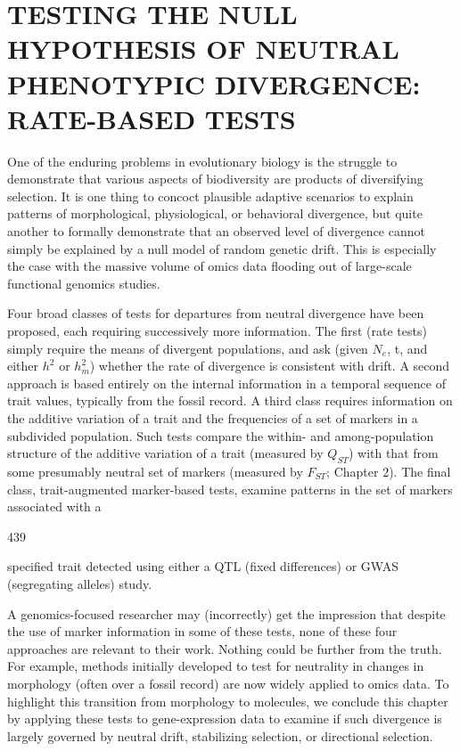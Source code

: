 \documentclass{article}
\begin{document}
\section{TESTING THE NULL HYPOTHESIS OF NEUTRAL PHENOTYPIC DIVERGENCE: RATE-BASED TESTS}
One of the enduring problems in evolutionary biology is the struggle to demonstrate that various aspects of biodiversity are products of diversifying selection. It is one thing to concoct plausible adaptive scenarios to explain patterns of morphological, physiological, or behavioral divergence, but quite another to formally demonstrate that an observed level of divergence cannot simply be explained by a null model of random genetic drift. This is especially the case with the massive volume of omics data flooding out of large-scale functional genomics studies.

Four broad classes of tests for departures from neutral divergence have been proposed, each requiring successively more information. The first (rate tests) simply require the means of divergent populations, and ask (given  $ N_e $, t, and either  $ h^2 $ or  $ h_m^2 $) whether the rate of divergence is consistent with drift. A second approach is based entirely on the internal information in a temporal sequence of trait values, typically from the fossil record. A third class requires information on the additive variation of a trait and the frequencies of a set of markers in a subdivided population. Such tests compare the within- and among-population structure of the additive variation of a trait (measured by  $ Q_{ST} $) with that from some presumably neutral set of markers (measured by  $ F_{ST} $; Chapter 2). The final class, trait-augmented marker-based tests, examine patterns in the set of markers associated with a

439

specified trait detected using either a QTL (fixed differences) or GWAS (segregating alleles) study.

A genomics-focused researcher may (incorrectly) get the impression that despite the use of marker information in some of these tests, none of these four approaches are relevant to their work. Nothing could be further from the truth. For example, methods initially developed to test for neutrality in changes in morphology (often over a fossil record) are now widely applied to omics data. To highlight this transition from morphology to molecules, we conclude this chapter by applying these tests to gene-expression data to examine if such divergence is largely governed by neutral drift, stabilizing selection, or directional selection.
\end{document}
